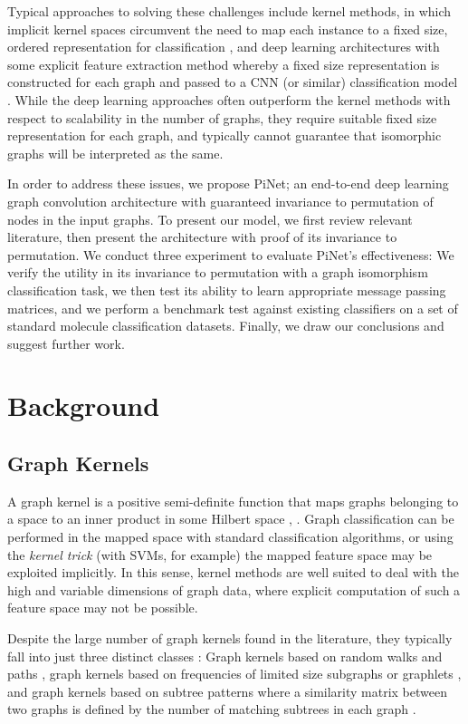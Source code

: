 \documentclass{article}
\theoremstyle{definition}
\begin{document}
Typical approaches to solving these challenges include kernel methods, in which implicit kernel spaces circumvent the need to map each instance to a fixed size, ordered representation for classification \cite{Zhang2018}, and deep learning architectures with some explicit feature extraction method whereby a fixed size representation is constructed for each graph and passed to a CNN (or similar) classification model \cite{Niepert2016}. While the deep learning approaches often outperform the kernel methods with respect to scalability in the number of graphs, they require suitable fixed size representation for each graph, and typically cannot guarantee that isomorphic graphs will be interpreted as the same.

In order to address these issues, we propose PiNet; an end-to-end deep learning graph convolution architecture with guaranteed invariance to permutation of nodes in the input graphs. To present our model, we first review relevant literature, then present the architecture with proof of its invariance to permutation. We conduct three experiment to evaluate PiNet's effectiveness: We verify the utility in its invariance to permutation with a graph isomorphism classification task, we then test its ability to learn appropriate message passing matrices, and we perform a benchmark test against existing classifiers on a set of standard molecule classification datasets. Finally, we draw our conclusions and suggest further work.

\section{Background}

\subsection{Graph Kernels}



A graph kernel  is a positive semi-definite function that maps graphs belonging to a space  to an inner product in some Hilbert space , . Graph classification can be performed in the mapped space  with standard classification algorithms, or using the \emph{kernel trick} (with SVMs, for example) the mapped feature space may be exploited implicitly. In this sense, kernel methods are well suited to deal with the high and variable dimensions of graph data, where explicit computation of such a feature space may not be possible.

Despite the large number of graph kernels found in the literature, they typically fall into just three distinct classes \cite{ShervashidzeNINOSHERVASHIDZE2011}: Graph kernels based on random walks and paths \cite{Borgwardt2005}, graph kernels based on frequencies of limited size subgraphs or graphlets \cite{Shervashidze2009}, and graph kernels based on subtree patterns where a similarity matrix between two graphs is defined by the number of matching subtrees in each graph \cite{Harchaoui2007}.
\end{document}
